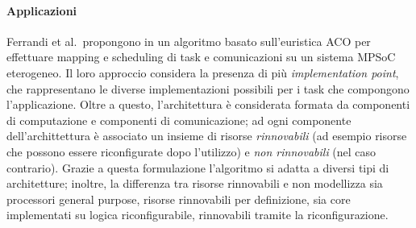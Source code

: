 \paragraph{Applicazioni}
Ferrandi et al.~propongono in \cite{AntColonyOptimization} un algoritmo basato 
sull'euristica \ac{ACO} per effettuare mapping e scheduling di task e 
comunicazioni su un sistema \ac{MPSoC} eterogeneo. Il loro approccio considera 
la presenza di più \emph{implementation point}, che rappresentano le diverse 
implementazioni possibili per i task che compongono l'applicazione. Oltre a 
questo, l'architettura è considerata formata da componenti di computazione e 
componenti di comunicazione; ad ogni componente dell'archittettura è associato 
un insieme di risorse \emph{rinnovabili} (ad esempio risorse che possono essere 
riconfigurate dopo l'utilizzo) e \emph{non rinnovabili} (nel caso contrario).
Grazie a questa formulazione l'algoritmo si adatta a diversi tipi di 
architetture; inoltre, la differenza tra risorse rinnovabili e non modellizza 
sia processori general purpose, risorse rinnovabili per definizione, sia core 
implementati su logica riconfigurabile, rinnovabili tramite la riconfigurazione.



